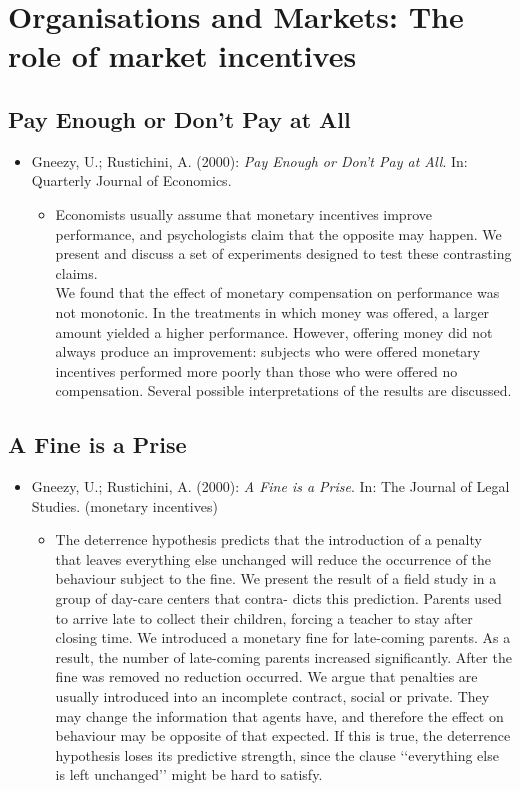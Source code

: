 
\chapter{Organisations and Markets: The role of market incentives}


\section{Pay Enough or Don't Pay at All}
\begin{itemize}
	\item Gneezy, U.; Rustichini, A. (2000): \textit{Pay Enough or Don't Pay at All}. In: Quarterly Journal of Economics.
		\begin{itemize}
			\item Economists usually assume that monetary incentives improve performance, and psychologists claim that the opposite may happen. We present and discuss a set of experiments designed to test these contrasting claims. \\
				We found that the effect of monetary compensation on performance was not monotonic. In the treatments in which money was offered, a larger amount yielded a higher performance. However, offering money did not always produce an improvement: subjects who were offered monetary incentives performed more poorly than those who were offered no compensation. Several possible interpretations of the results are discussed.
		\end{itemize}
\end{itemize}

\section{A Fine is a Prise}
\begin{itemize}
	\item Gneezy, U.; Rustichini, A. (2000): \textit{A Fine is a Prise}. In: The Journal of Legal Studies. (monetary incentives)
		\begin{itemize}
			\item The deterrence hypothesis predicts that the introduction of a penalty that leaves everything else unchanged will reduce the occurrence of the behaviour subject to the fine. We present the result of a field study in a group of day-care centers that contra- dicts this prediction. Parents used to arrive late to collect their children, forcing a teacher to stay after closing time. We introduced a monetary fine for late-coming parents. As a result, the number of late-coming parents increased significantly. After the fine was removed no reduction occurred. We argue that penalties are usually introduced into an incomplete contract, social or private. They may change the information that agents have, and therefore the effect on behaviour may be opposite of that expected. If this is true, the deterrence hypothesis loses its predictive strength, since the clause ‘‘everything else is left unchanged’’ might be hard to satisfy.
		\end{itemize}
\end{itemize}

